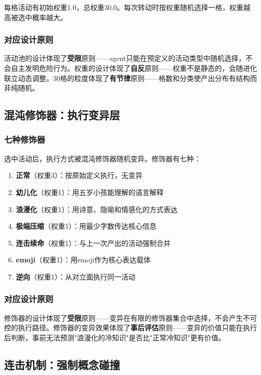 \documentclass[12pt,a4paper]{ctexart}
\begin{document}
每格活动有初始权重1.0，总权重30.0。每次转动时按权重随机选择一格，权重越高被选中概率越大。

\subsubsection{对应设计原则}

活动池的设计体现了\textbf{受限}原则——agent只能在预定义的活动类型中随机选择，不会自主发明危险行为。权重的设计体现了\textbf{自反}原则——权重不是静态的，会随进化联立动态调整。30格的粒度体现了\textbf{有节律}原则——格数和分类使产出分布有结构而非纯随机。

\subsection{混沌修饰器：执行变异层}

\subsubsection{七种修饰器}

选中活动后，执行方式被混沌修饰器随机变异。修饰器有七种：

\begin{enumerate}[nosep]
\item \textbf{正常}（权重3）：按原始定义执行，无变异
\item \textbf{幼儿化}（权重1）：用五岁小孩能理解的语言解释
\item \textbf{浪漫化}（权重1）：用诗意、隐喻和情感化的方式表达
\item \textbf{极端压缩}（权重1）：用最少字数传达核心信息
\item \textbf{连击续命}（权重1）：与上一次产出的活动强制合并
\item \textbf{emoji}（权重1）：用emoji作为核心表达载体
\item \textbf{逆向}（权重1）：从对立面执行同一活动
\end{enumerate}

\subsubsection{对应设计原则}

修饰器的设计体现了\textbf{受限}原则——变异在有限的修饰器集合中选择，不会产生不可控的执行路径。修饰器的变异效果体现了\textbf{事后评估}原则——变异的价值只能在执行后判断，事前无法预测"浪漫化的冷知识"是否比"正常冷知识"更有价值。

\subsection{连击机制：强制概念碰撞}
\end{document}
